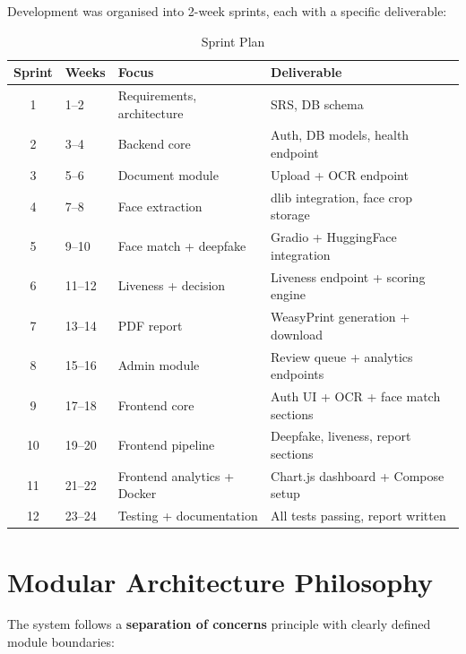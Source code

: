 \documentclass[12pt,a4paper]{report}
\begin{document}
Development was organised into 2-week sprints, each with a specific deliverable:

\begin{table}[H]
\centering
\caption{Sprint Plan}
\begin{tabular}{@{}clll@{}}
\toprule
\textbf{Sprint} & \textbf{Weeks} & \textbf{Focus} & \textbf{Deliverable} \\
\midrule
1 & 1--2 & Requirements, architecture & SRS, DB schema \\
2 & 3--4 & Backend core & Auth, DB models, health endpoint \\
3 & 5--6 & Document module & Upload + OCR endpoint \\
4 & 7--8 & Face extraction & dlib integration, face crop storage \\
5 & 9--10 & Face match + deepfake & Gradio + HuggingFace integration \\
6 & 11--12 & Liveness + decision & Liveness endpoint + scoring engine \\
7 & 13--14 & PDF report & WeasyPrint generation + download \\
8 & 15--16 & Admin module & Review queue + analytics endpoints \\
9 & 17--18 & Frontend core & Auth UI + OCR + face match sections \\
10 & 19--20 & Frontend pipeline & Deepfake, liveness, report sections \\
11 & 21--22 & Frontend analytics + Docker & Chart.js dashboard + Compose setup \\
12 & 23--24 & Testing + documentation & All tests passing, report written \\
\bottomrule
\end{tabular}
\end{table}

\section{Modular Architecture Philosophy}

The system follows a \textbf{separation of concerns} principle with clearly defined module boundaries:
\end{document}
